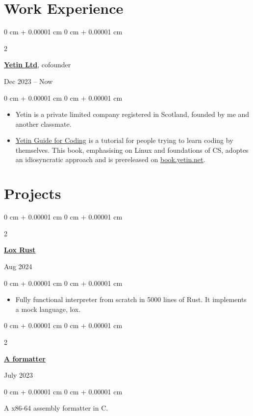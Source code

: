 \documentclass[10pt, a4paper]{article}
\newenvironment{highlights}{
    \begin{itemize}[
        topsep=0.10 cm,
        parsep=0.10 cm,
        partopsep=0pt,
        itemsep=0pt,
        leftmargin=0 cm + 10pt
    ]
}{
    \end{itemize}
} %
\newenvironment{onecolentry}{
    \begin{adjustwidth}{
        0 cm + 0.00001 cm
    }{
        0 cm + 0.00001 cm
    }
}{
    \end{adjustwidth}
} %
\newenvironment{twocolentry}[2][]{
    \onecolentry
    \def\secondColumn{#2}
    \setcolumnwidth{\fill, 4.5 cm}
    \begin{paracol}{2}
}{
    \switchcolumn \raggedleft \secondColumn
    \end{paracol}
    \endonecolentry
} %
\begin{document}
    
    \section{Work Experience}

        \begin{twocolentry}{
            Dec 2023 – Now
        }
			\href{https://yetin.net}{\textbf{\underline{Yetin Ltd}}}, cofounder
		\end{twocolentry}
        \vspace{0.10 cm}
        \begin{onecolentry}
            \begin{highlights}
				\item Yetin is a private limited company registered in Scotland, founded by me and another classmate.
				\item \href{https://book.yetin.net}{\underline{Yetin Guide for Coding}} is
					a tutorial for people trying to learn coding by themselves. 
					This book, emphasising on Linux and foundations of CS, adoptes an idiosyncratic approach and is prereleased on \href{https://book.yetin.net}{\underline{book.yetin.net}}.
            \end{highlights}
        \end{onecolentry}
    
    \section{Projects}

        \begin{twocolentry}{
            Aug 2024
		}
		\href{https://github.com/harryhanYuhao/lox-rust.git}{\underline{\textbf{Lox Rust}}}
		\end{twocolentry}
        \vspace{0.10 cm}
        \begin{onecolentry}
            \begin{highlights}
                \item Fully functional interpreter from scratch in 5000 lines of Rust.
				It implements a mock language, lox.
            \end{highlights}
        \end{onecolentry}

        \vspace{0.15 cm}

        \begin{twocolentry}{
				July 2023
        }
		\href{https://github.com/harryhanYuhao/aformatter}{\underline{\textbf{A formatter}}}
		\end{twocolentry}
        \vspace{0.10 cm}
        \begin{onecolentry}
			A x86-64 assembly formatter in C.
        \end{onecolentry}
\end{document}
